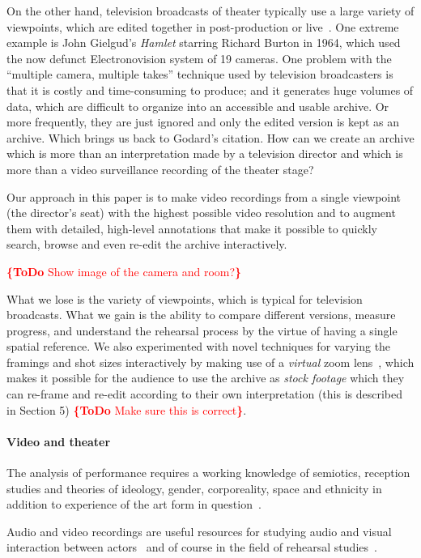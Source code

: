 \documentclass[conference]{IEEEtran}
\newcommand{\todo}[1]{\noindent\textcolor{red}{{\bf \{ToDo} #1{\bf \}}}}
\begin{document}
On the other hand, television broadcasts of theater typically use a large variety of viewpoints, which are edited together
in post-production or live~\cite{bouchez2007filmer}. One extreme example is John Gielgud's 
\emph{Hamlet} starring Richard Burton in 1964, which used  the now defunct Electronovision system of 19 cameras. 
One problem with the ``multiple camera, multiple takes'' technique used by television broadcasters 
is that it is costly and time-consuming to produce; and it generates huge volumes of data, which are 
difficult to organize into an accessible and usable archive. Or more frequently, they are just ignored
and only the edited version is kept as an archive. Which brings us back to Godard's citation. How can we create 
an archive which is  more than an interpretation made by a television director and which is more than a video surveillance recording of the theater stage? 

Our approach in this paper is to make video recordings from a single viewpoint (the director's seat) with the highest possible
video resolution and to augment them with detailed, high-level  annotations that make it possible to quickly  search, browse
and even re-edit the archive interactively. 


\todo{Show image of the camera and room?}

What we lose is the variety of viewpoints, which is typical for television broadcasts. What we gain is the ability to compare
different versions, measure progress, and understand the rehearsal process by the virtue of having a single spatial reference.
We also experimented with novel techniques for varying the framings and shot sizes interactively 
by making use of a {\em virtual}  zoom lens~\cite{Gandhi14}, which makes it possible for the audience to
use the archive as {\em stock footage} which they can re-frame and re-edit according to their own interpretation (this is described in Section 5) \todo{Make sure this is correct}. 


\paragraph*{Video and theater}

The analysis of performance requires a working knowledge of semiotics, reception studies and theories 
of ideology, gender, corporeality, space and ethnicity in addition to experience of the art form in question~\cite{Auslander97,Counsell01}.

Audio and video recordings are useful resources for studying audio and visual interaction between actors~\cite{Fitzpatrick90}
and of course in the field of rehearsal studies~\cite{McAuley98a,McAuley98b,McAuley06,McAuley08}.
\end{document}
